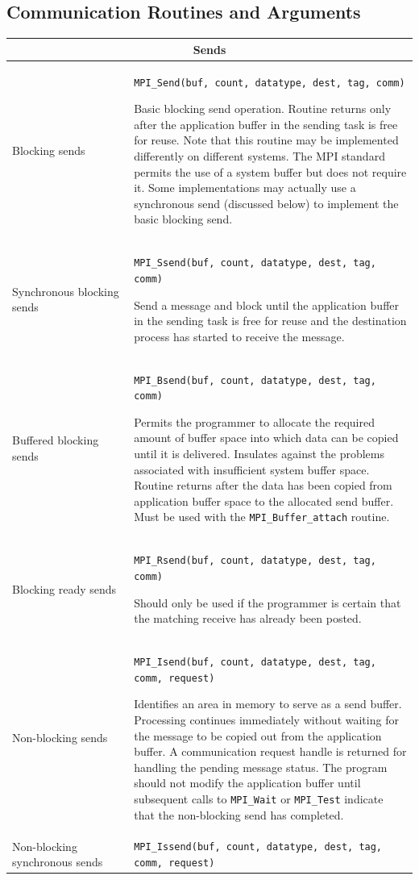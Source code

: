 \subsection{Communication Routines and Arguments}
\begin{tabular}{|p{0.3\linewidth}|p{0.75\linewidth}|}
\hline
\multicolumn{2}{|c|}{\textbf{Sends}} \\
\hline
Blocking sends & \texttt{MPI\_Send(buf, count, datatype, dest, tag, comm)} 

Basic blocking send operation. Routine returns only after the application buffer in the sending task is free for reuse. Note that this routine may be implemented differently on different systems. The MPI standard permits the use of a system buffer but does not require it. Some implementations may actually use a synchronous send (discussed below) to implement the basic blocking send. \\
\hline
Synchronous blocking sends & \texttt{MPI\_Ssend(buf, count, datatype, dest, tag, comm)} 

Send a message and block until the application buffer in the sending task is free for reuse and the destination process has started to receive the message.\\
\hline
Buffered blocking sends & \texttt{MPI\_Bsend(buf, count, datatype, dest, tag, comm)} 

Permits the programmer to allocate the required amount of buffer space into which data can be copied until it is delivered. Insulates against the problems associated with insufficient system buffer space. Routine returns after the data has been copied from application buffer space to the allocated send buffer. Must be used with the \texttt{MPI\_Buffer\_attach} routine. \\
\hline
Blocking ready sends & \texttt{MPI\_Rsend(buf, count, datatype, dest, tag, comm)} 

Should only be used if the programmer is certain that the matching receive has already been posted. \\
\hline
Non-blocking sends &  \texttt{MPI\_Isend(buf, count, datatype, dest, tag, comm, request)} 

Identifies an area in memory to serve as a send buffer. Processing continues immediately without 
waiting  for  the  message  to  be  copied  out  from  the  application  buffer.  A communication  request 
handle  is  returned  for  handling  the  pending  message  status.  The  program  should  not  modify  the application  buffer  until  subsequent  calls  to  \texttt{MPI\_Wait}  or  \texttt{MPI\_Test}  indicate  that  the  non-blocking send has completed.   \\
\hline
Non-blocking synchronous sends &  \texttt{MPI\_Issend(buf, count, datatype, dest, tag, comm, request)} 


\end{tabular}

